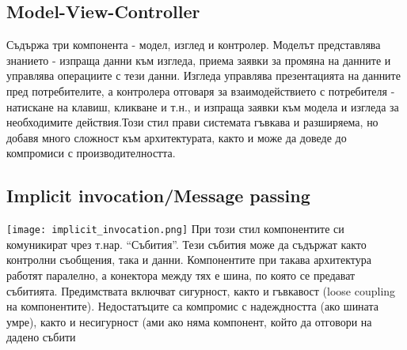 \documentclass[fleqn,12pt]{article}
\begin{document}
\subsection{Model-View-Controller}
Съдържа три компонента - модел, изглед и контролер.
Моделът представлява знанието - изпраща данни към изгледа, приема заявки за промяна на данните и управлява операциите с тези данни. Изгледа управлява презентацията на данните пред потребителите, а контролера отговаря за взаимодействието с потребителя - натискане на клавиш, кликване и т.н., и изпраща заявки към модела и изгледа за необходимите действия.Този стил прави системата гъвкава и разширяема, но добавя много сложност към архитектурата, както и може да доведе до компромиси с производителността.

\subsection{Implicit invocation/Message passing}
\texttt{[image: implicit\_invocation.png]}
При този стил компонентите си комуникират чрез т.нар. “Събития”. Тези събития може да съдържат както контролни съобщения, така и данни. Компонентите при такава архитектура работят паралелно, а конектора между тях е шина, по която се предават събитията. Предимствата включват сигурност, както и гъвкавост (loose coupling на компонентите). Недостатъците са компромис с надеждността (ако шината умре), както и несигурност (ами ако няма компонент, който да отговори на дадено събити
\end{document}
